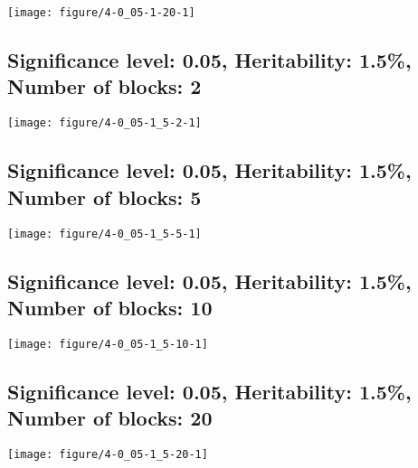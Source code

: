 \documentclass[11pt,letter]{article}\usepackage[]{graphicx}\usepackage[]{color}
\makeatletter
\def\maxwidth{ %
  \ifdim\Gin@nat@width>\linewidth
    \linewidth
  \else
    \Gin@nat@width
  \fi
}
\newenvironment{knitrout}{}{} %
\makeatother
\begin{document}
\begin{knitrout}
\color{fgcolor}
\texttt{[image: figure/4-0\_05-1-20-1]} 

\end{knitrout}

\newpage
\subsection{Significance level: 0.05, Heritability: 1.5\%, Number of blocks: 2}

\begin{knitrout}
\color{fgcolor}
\texttt{[image: figure/4-0\_05-1\_5-2-1]} 

\end{knitrout}

\newpage
\subsection{Significance level: 0.05, Heritability: 1.5\%, Number of blocks: 5}

\begin{knitrout}
\color{fgcolor}
\texttt{[image: figure/4-0\_05-1\_5-5-1]} 

\end{knitrout}

\newpage
\subsection{Significance level: 0.05, Heritability: 1.5\%, Number of blocks: 10}

\begin{knitrout}
\color{fgcolor}
\texttt{[image: figure/4-0\_05-1\_5-10-1]} 

\end{knitrout}

\newpage
\subsection{Significance level: 0.05, Heritability: 1.5\%, Number of blocks: 20}

\begin{knitrout}
\color{fgcolor}
\texttt{[image: figure/4-0\_05-1\_5-20-1]} 

\end{knitrout}
\end{document}
